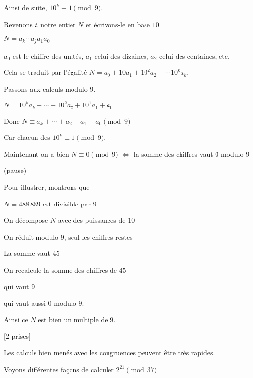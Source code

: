 \change

Ainsi de suite, $10^k \equiv 1 \pmod 9$.

\change

Revenons à notre entier $N$ et écrivons-le en base $10$ 

$N = \underline{a_k \cdots a_2 a_1 a_0}$

$a_0$ est le chiffre des unités, $a_1$ celui des dizaines, $a_2$ celui des centaines, etc.

\change

Cela se traduit par l'égalité 
$N =  a_0 + 10 a_1 + 10^2 a_2 + \cdots 10^k a_k$.

\change

Passons aux calculs modulo $9$.


$N = 10^k a_k + \cdots + 10^2 a_2 + 10^1 a_1 + a_0$

Donc 
$ N \equiv  a_k + \cdots + a_2 + a_1 + a_0 \pmod 9 $

Car chacun des $10^k \equiv 1 \pmod 9$.


\change

Maintenant on a bien $N \equiv 0 \pmod 9$ $\iff$ la somme des chiffres vaut $0$ modulo $9$

\change

(pause)

Pour illustrer, montrons que 

$N = 488\, 889$ est divisible par $9$.

\change

On décompose $N$ avec des puissances de $10$

\change

On réduit modulo $9$, seul les chiffres restes

\change

La somme vaut $45$

\change

On recalcule la somme des chiffres de $45$

qui vaut $9$

\change

qui vaut aussi $0$ modulo $9$.

Ainsi ce $N$ est bien un multiple de $9$.


\diapo

[2 prises]

Les calculs bien menés avec les congruences peuvent être très rapides.

Voyons différentes façons de calculer $2^{21} \pmod {37}$

